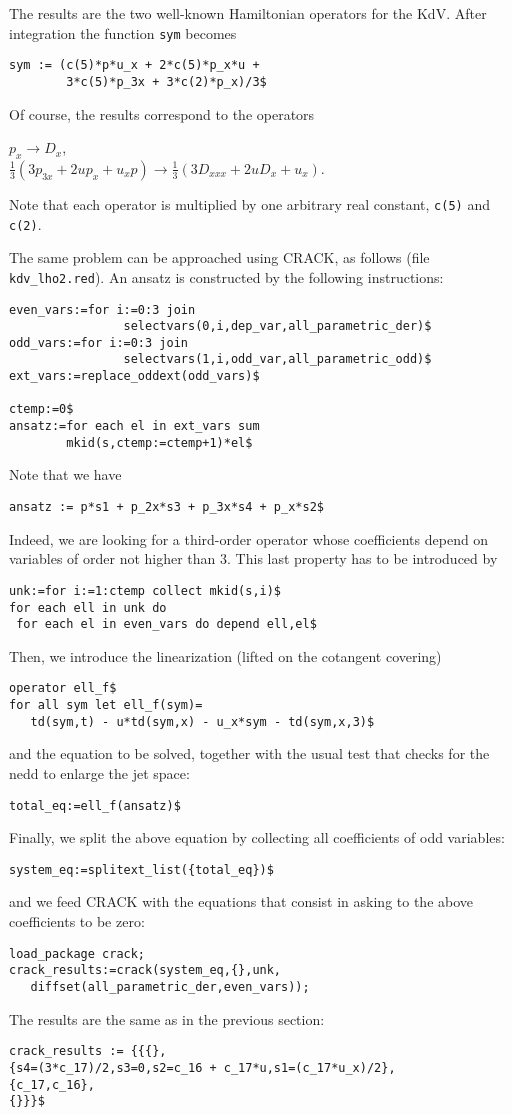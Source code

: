 The results are the two well-known Hamiltonian operators for the KdV. 
After integration the function \texttt{sym} becomes
\begin{verbatim}
sym := (c(5)*p*u_x + 2*c(5)*p_x*u +
        3*c(5)*p_3x + 3*c(2)*p_x)/3$
\end{verbatim}
Of course, the results correspond to the operators
\begin{center}
  $p_x \to D_x$,\\
  $\displaystyle\frac{1}{3}(3p_{3x} + 2up_x + u_xp) \to \frac{1}{3}(3D_{xxx} + 2uD_{x} + u_x)$.
\end{center}
Note that each operator is multiplied by one arbitrary real
constant, \texttt{c(5)} and \texttt{c(2)}.

The same problem can be approached using CRACK, as follows (file
\texttt{kdv\_lho2.red}). An ansatz is constructed by the following
instructions:
\begin{verbatim}
even_vars:=for i:=0:3 join
                selectvars(0,i,dep_var,all_parametric_der)$
odd_vars:=for i:=0:3 join
                selectvars(1,i,odd_var,all_parametric_odd)$
ext_vars:=replace_oddext(odd_vars)$

ctemp:=0$
ansatz:=for each el in ext_vars sum
        mkid(s,ctemp:=ctemp+1)*el$
\end{verbatim}
Note that we have
\begin{verbatim}
ansatz := p*s1 + p_2x*s3 + p_3x*s4 + p_x*s2$
\end{verbatim}
Indeed, we are looking for a third-order operator whose coefficients depend on
variables of order not higher than $3$. This last property has to be introduced
by
\begin{verbatim}
unk:=for i:=1:ctemp collect mkid(s,i)$
for each ell in unk do
 for each el in even_vars do depend ell,el$
\end{verbatim}
Then, we introduce the linearization (lifted on the cotangent covering)
\begin{verbatim}
operator ell_f$
for all sym let ell_f(sym)=
   td(sym,t) - u*td(sym,x) - u_x*sym - td(sym,x,3)$
\end{verbatim}
and the equation to be solved, together with the usual test that checks for the
nedd to enlarge the jet space:
\begin{verbatim}
total_eq:=ell_f(ansatz)$
\end{verbatim}
Finally, we split the above equation by collecting all coefficients of odd
variables:
\begin{verbatim}
system_eq:=splitext_list({total_eq})$
\end{verbatim}
and we feed CRACK with the equations that consist in asking to the above
coefficients to be zero:
\begin{verbatim}
load_package crack;
crack_results:=crack(system_eq,{},unk,
   diffset(all_parametric_der,even_vars));
\end{verbatim}
The results are the same as in the previous section:
\begin{verbatim}
crack_results := {{{},
{s4=(3*c_17)/2,s3=0,s2=c_16 + c_17*u,s1=(c_17*u_x)/2},
{c_17,c_16},
{}}}$
\end{verbatim}


